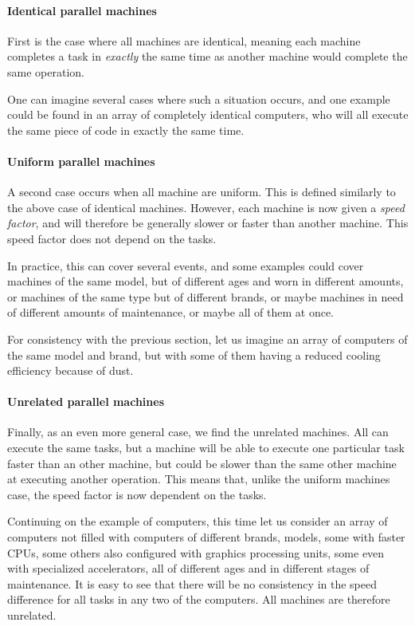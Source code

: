 \documentclass{mimosis}
\begin{document}
\paragraph{Identical parallel machines}
First is the case where all machines are identical, meaning each machine completes a task in \emph{exactly} the same time as another machine would complete the same operation. 

One can imagine several cases where such a situation occurs, and one example could be found in an array of completely identical computers, who will all execute the same piece of code in exactly the same time.

\paragraph{Uniform parallel machines}

A second case occurs when all machine are uniform. This is defined similarly to the above case of identical machines. However, each machine is now given a \emph{speed factor}, and will therefore be generally slower or faster than another machine. This speed factor does not depend on the tasks.

In practice, this can cover several events, and some examples could cover machines of the same model, but of different ages and worn in different amounts, or machines of the same type but of different brands, or maybe machines in need of different amounts of maintenance, or maybe all of them at once.

For consistency with the previous section, let us imagine an array of computers of the same model and brand, but with some of them having a reduced cooling efficiency because of dust.

\paragraph{Unrelated parallel machines}

Finally, as an even more general case, we find the unrelated machines. All can execute the same tasks, but a machine will be able to execute one particular task faster than an other machine, but could be slower than the same other machine at executing another operation. This means that, unlike the uniform machines case, the speed factor is now dependent on the tasks.

Continuing on the example of computers, this time let us consider an array of computers not filled with computers of different brands, models, some with faster CPUs, some others also configured with graphics processing units, some even with specialized accelerators, all of different ages and in different stages of maintenance. It is easy to see that there will be no consistency in the speed difference for all tasks in any two of the computers. All machines are therefore unrelated.
\end{document}

